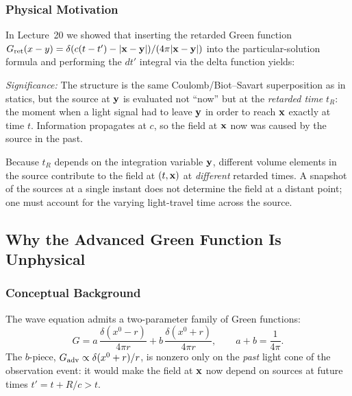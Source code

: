 \subsubsection*{Physical Motivation}
In Lecture~20 we showed that inserting the retarded Green function
$G_{\rm ret}(x-y)=\delta(c(t-t')-|\mathbf{x}-\mathbf{y}|)/(4\pi|\mathbf{x}-\mathbf{y}|)$
into the particular-solution formula and performing the $dt'$ integral via the delta
function yields:


\textit{Significance:} The structure is the same Coulomb/Biot--Savart superposition as in
statics, but the source at $\mathbf{y}$ is evaluated not ``now'' but at the \emph{retarded
time} $t_R$: the moment when a light signal had to leave $\mathbf{y}$ in order to reach
$\mathbf{x}$ exactly at time $t$. Information propagates at $c$, so the field at $\mathbf{x}$
now was caused by the source in the past.

\begin{remark}
Because $t_R$ depends on the integration variable $\mathbf{y}$, different volume elements
in the source contribute to the field at $(t,\mathbf{x})$ at \emph{different} retarded
times. A snapshot of the sources at a single instant does not determine the field at a
distant point; one must account for the varying light-travel time across the source.
\end{remark}

\subsection{Why the Advanced Green Function Is Unphysical}
\label{subsec:lec21-advanced}

\subsubsection*{Conceptual Background}
The wave equation admits a two-parameter family of Green functions:
\[
  G = a\,\frac{\delta(x^0 - r)}{4\pi r} + b\,\frac{\delta(x^0 + r)}{4\pi r},
  \qquad a + b = \frac{1}{4\pi}.
\]
The $b$-piece, $G_{\rm adv} \propto \delta(x^0+r)/r$, is nonzero only on the
\emph{past} light cone of the observation event: it would make the field at $\mathbf{x}$
now depend on sources at future times $t' = t + R/c > t$.


